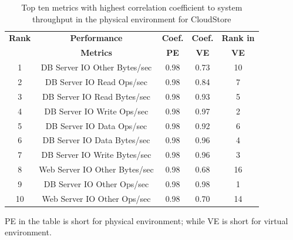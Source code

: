 \begin{table}[tbh]
	\centering
	\caption{Top ten metrics with highest correlation coefficient to system throughput in the physical environment for CloudStore}
	\label{tab:top10csp}
	\begin{threeparttable}
	
		\begin{tabular}{|c||c|c|c|c|}
			\hline
			\textbf{Rank} & \textbf{Performance } & \textbf{Coef. } & \textbf{Coef. } & \textbf{Rank in} \\ %
			& \textbf{ Metrics} & \textbf{PE} & \textbf{VE} & \textbf{VE} \\ %
			\midrule
			\midrule
			1 & DB Server IO Other Bytes/sec & 0.98 & 0.73 & 10 \\ \hline
			2 & DB Server IO Read Ops/sec & 0.98 & 0.84 & 7 \\ \hline
			3 & DB Server IO Read Bytes/sec & 0.98 & 0.93 & 5 \\ \hline
			4 & DB Server IO Write Ops/sec & 0.98 & 0.97 & 2 \\ \hline
			5 & DB Server IO Data Ops/sec & 0.98 & 0.92 & 6 \\ \hline
			6 & DB Server IO Data Bytes/sec & 0.98 & 0.96 & 4 \\ \hline
			7 & DB Server IO Write Bytes/sec & 0.98 & 0.96 & 3 \\ \hline
			8 & Web Server IO Other Bytes/sec & 0.98 & 0.68 & 16 \\ \hline
			9 & DB Server IO Other Ops/sec & 0.98 & 0.98 & 1 \\ \hline
			10 & Web Server IO Other Ops/sec & 0.98 & 0.70 & 14 \\ \hline
		\end{tabular}%
		\begin{tablenotes}
			\item PE in the table is short for physical environment; while VE is short for virtual environment.
		\end{tablenotes}
	\end{threeparttable}
	
	
\end{table}



